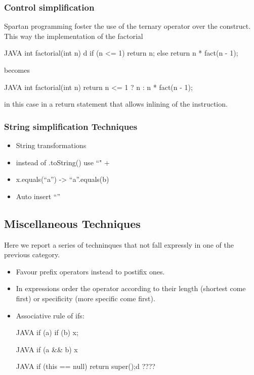 \subsubsection{Control simplification}
Spartan programming foster the use of the ternary operator over the  construct.
This way the implementation of the factorial
\begin{code}{JAVA}
int factorial(int n) {d
    if (n <= 1)
        return n;
    else
        return n * fact(n - 1);
}
\end{code}
becomes
\begin{code}{JAVA}
int factorial(int n) {
    return n <= 1 ? n : n * fact(n - 1);
}
\end{code}

in this case in a return statement that allows inlining of the instruction.

\subsubsection{String simplification Techniques}
\begin{itemize}
 \item String transformations
 \item instead of .toString() use ``" +
 \item x.equals(“a”) -> “a”.equals(b)
 \item Auto insert “”
\end{itemize}

\subsection{Miscellaneous Techniques}

Here we report a series of techninques that not fall expressly in one of the previous category.

\begin{itemize}
\item Favour prefix operators instead to postifix ones.
\item In expressions order the operator according to their length (shortest come first)
or specificity (more specific come first).

\item Associative rule of ifs: 
  \begin{code}{JAVA}
if (a) if (b) x;
\end{code}
  \begin{code}{JAVA}
if (a && b) x
  \end{code}
\begin{code}{JAVA}
if (this == null) return super();d
????\end{code}
  
\end{itemize}


